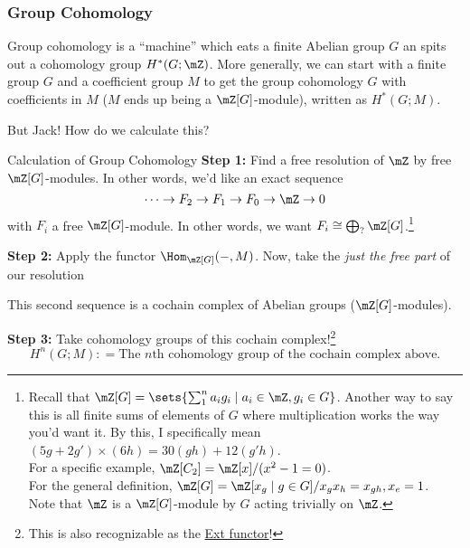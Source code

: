 \newpage
\subsubsection{Group Cohomology}

Group cohomology is a ``machine'' which eats a finite Abelian group $G$ an spits out a cohomology group $H^\ast(G;\mZ)$. More generally, we can start with a finite group $G$ and a coefficient group $M$ to get the group cohomology $G$ with coefficients in $M$ ($M$ ends up being a $\mZ[G]$-module), written as $H^\ast(G;M)$. 

But Jack! How do we calculate this?

\begin{definition}{Calculation of Group Cohomology}{}
    \textbf{Step 1:} Find a free resolution of $\mZ$ by free $\mZ[G]$-modules. In other words, we'd like an exact sequence
    $$\cdots\to F_2\to F_1\to F_0\to \mZ\to 0$$
    with $F_i$ a free $\mZ[G]$-module. In other words, we want $F_i\cong \bigoplus_{?}\mZ[G]$.\footnote{Recall that $\mZ[G] = \sets{\sum_1^n a_i g_i\mid a_i\in \mZ, g_i\in G}$. Another way to say this is all finite sums of elements of $G$ where multiplication works the way you'd want it. By this, I specifically mean $(5g+2g')\times (6h) = 30(gh)+12(g'h)$. \\For a specific example, $\mZ[C_2] = \mZ[x]/(x^2-1 = 0)$. \\For the general definition, $\mZ[G] = \mZ[x_g\mid g\in G]/ x_gx_h = x_{gh}, x_e = 1$. \\Note that $\mZ$ is a $\mZ[G]$-module by $G$ acting trivially on $\mZ$.} 

    \medskip
    \textbf{Step 2:} Apply the functor $\Hom_{\mZ[G]}(-,M)$. Now, take the \emph{just the free part} of our resolution 
    \begin{center}
    \end{center}
    This second sequence is a cochain complex of Abelian groups ($\mZ[G]$-modules).
    
    \medskip
    \textbf{Step 3:} Take cohomology groups of this cochain complex!\footnote{This is also recognizable as the \href{https://en.wikipedia.org/wiki/Ext_functor}{Ext functor}!} $$H^n(G;M): = \text{The $n$th cohomology group of the cochain complex above.}$$
\end{definition}
